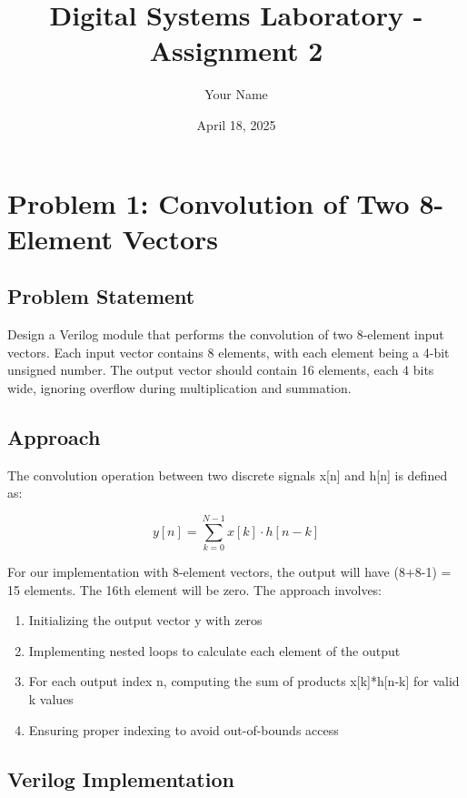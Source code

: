 \documentclass{article}
\title{Digital Systems Laboratory - Assignment 2}
\author{Your Name}
\date{April 18, 2025}
\begin{document}
\maketitle

\section{Problem 1: Convolution of Two 8-Element Vectors}

\subsection{Problem Statement}
Design a Verilog module that performs the convolution of two 8-element input vectors. Each input vector contains 8 elements, with each element being a 4-bit unsigned number. The output vector should contain 16 elements, each 4 bits wide, ignoring overflow during multiplication and summation.

\subsection{Approach}
The convolution operation between two discrete signals x[n] and h[n] is defined as:

$$y[n] = \sum_{k=0}^{N-1} x[k] \cdot h[n-k]$$

For our implementation with 8-element vectors, the output will have (8+8-1) = 15 elements. The 16th element will be zero. The approach involves:

\begin{enumerate}
	\item Initializing the output vector y with zeros
	\item Implementing nested loops to calculate each element of the output
	\item For each output index n, computing the sum of products x[k]*h[n-k] for valid k values
	\item Ensuring proper indexing to avoid out-of-bounds access
\end{enumerate}

\subsection{Verilog Implementation}
\end{document}
